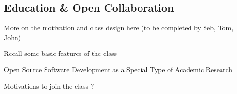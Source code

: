 \subsection{Education \& Open Collaboration}
\label{classmotivations}

More on the motivation and class design here (to be completed by Seb, Tom, John)


Recall some basic features of the class


Open Source Software Development as a Special Type of Academic Research
  \cite{bezroukov1999oss}

Motivations to join the class ?
